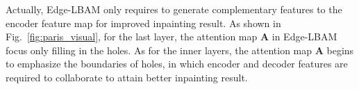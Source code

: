 \documentclass[10pt,journal,compsoc]{IEEEtran}
\begin{document}
Actually, Edge-LBAM only requires to generate complementary features to the encoder feature map for improved inpainting result.
%
As shown in Fig.~\ref{fig:paris_visual}, for the last layer, the attention map $\mathbf{A}$ in Edge-LBAM focus only filling in the holes.
%
As for the inner layers, the attention map $\mathbf{A}$ begins to emphasize the boundaries of holes, in which encoder and decoder features are required to collaborate to attain better inpainting result.



%
%
%
%
\end{document}

